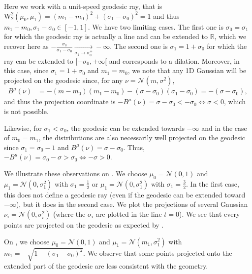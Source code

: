 \documentclass[twoside]{article}
\newcommand{\cN}{\mathcal{N}}
\newcommand{\W}{\mathrm{W}}
\begin{document}
Here we work with a unit-speed geodesic ray, that is $\W_2^2(\mu_0,\mu_1)=(m_1-m_0)^2 + (\sigma_1-\sigma_0)^2=1$ and thus $m_1-m_0,\sigma_1-\sigma_0 \in [-1,1]$. We have two limiting cases. The first one is $\sigma_0=\sigma_1$ for which the geodesic ray is actually a line and can be extended to $\mathbb{R}$, which we recover here as $-\frac{\sigma_0}{\sigma_1-\sigma_0}\xrightarrow[\sigma_1 \to \sigma_0^+]{}-\infty$. The second one is $\sigma_1 = 1+\sigma_0$ for which the ray can be extended to $[-\sigma_0, +\infty[$ and corresponds to a dilation. Moreover, in this case, since $\sigma_1=1+\sigma_0$ and $m_1=m_0$, we note that any 1D Gaussian will be projected on the geodesic since, for any $\nu=\cN(m,\sigma^2)$, 
\begin{equation}
    \begin{aligned}
        B^\mu(\nu) &= -(m-m_0)(m_1-m_0) - (\sigma-\sigma_0)(\sigma_1-\sigma_0) = -(\sigma-\sigma_0),
    \end{aligned}
\end{equation}
and thus the projection coordinate is $-B^\mu(\nu) = \sigma-\sigma_0 < -\sigma_0 \iff \sigma < 0$, which is not possible.

Likewise, for $\sigma_1<\sigma_0$, the geodesic can be extended towards $-\infty$ and in the case of $m_0=m_1$, the distributions are also necessarily well projected on the geodesic since $\sigma_1=\sigma_0-1$ and $B^\mu(\nu)=\sigma-\sigma_0$. Thus, $-B^\mu(\nu)=\sigma_0-\sigma > \sigma_0 \iff -\sigma>0$.


We illustrate these observations on . We choose $\mu_0=\mathcal{N}(0,1)$ and $\mu_1=\mathcal{N}(0, \sigma_1^2)$ with $\sigma_1=\frac12$ or $\mu_1=\mathcal{N}(0,\sigma_1^2)$ with $\sigma_1=\frac32$. In the first case, this does not define a geodesic ray (even if the geodesic can be extended toward $-\infty$), but it does in the second case. We plot the projections of several Gaussian $\nu_i=\mathcal{N}(0,\sigma_i^2)$ (where the $\sigma_i$ are plotted in the line $t=0$). We see that every points are projected on the geodesic as expected by .


On , we choose $\mu_0=\mathcal{N}(0,1)$ and $\mu_1=\mathcal{N}(m_1, \sigma_1^2)$ with $m_1=-\sqrt{1-(\sigma_1-\sigma_0)^2}$. We observe that some points projected onto the extended part of the geodesic are less consistent with the geometry.
\end{document}

